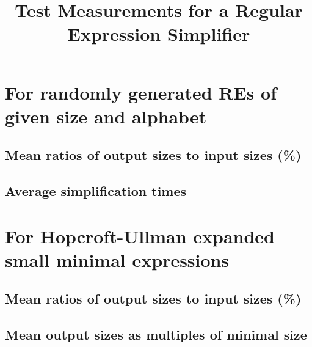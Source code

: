 \documentclass[a4paper]{article}
\title{Test Measurements for a Regular Expression Simplifier}
\author{}
\begin{document}
\maketitle
\section{For randomly generated REs of given size and alphabet}
\subsection{Mean ratios of output sizes to input sizes (\%)}

\clearpage
\subsection{Average simplification times}

\clearpage
\section{For Hopcroft-Ullman expanded small minimal expressions}
\subsection{Mean ratios of output sizes to input sizes (\%)}

\clearpage
\subsection{Mean output sizes as multiples of minimal size}

\end{document}
